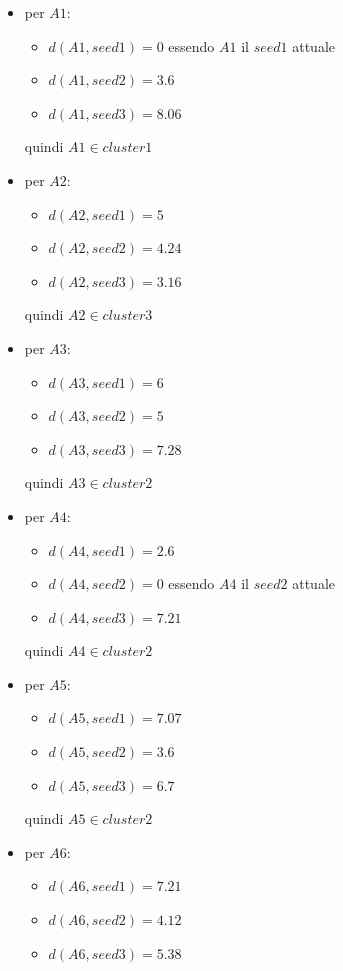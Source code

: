 \begin{esempio}
  \begin{itemize}
    \item per $A1$:
    \begin{itemize}
      \item $d(A1, seed1)=0$ essendo $A1$ il $seed1$ attuale
      \item $d(A1, seed2)=3.6$
      \item $d(A1, seed3)=8.06$
    \end{itemize}
    quindi $A1\in cluster1$
    \item per $A2$:
    \begin{itemize}
      \item $d(A2, seed1)=5$ 
      \item $d(A2, seed2)=4.24$
      \item $d(A2, seed3)=3.16$
    \end{itemize}
    quindi $A2\in cluster3$
    \item per $A3$:
    \begin{itemize}
      \item $d(A3, seed1)=6$ 
      \item $d(A3, seed2)=5$
      \item $d(A3, seed3)=7.28$
    \end{itemize}
    quindi $A3\in cluster2$
    \item per $A4$:
    \begin{itemize}
      \item $d(A4, seed1)=2.6$ 
      \item $d(A4, seed2)=0$ essendo $A4$ il $seed2$ attuale
      \item $d(A4, seed3)=7.21$
    \end{itemize}
    quindi $A4\in cluster2$
    \item per $A5$:
    \begin{itemize}
      \item $d(A5, seed1)=7.07$ 
      \item $d(A5, seed2)=3.6$
      \item $d(A5, seed3)=6.7$
    \end{itemize}
    quindi $A5\in cluster2$
    \item per $A6$:
    \begin{itemize}
      \item $d(A6, seed1)=7.21$ 
      \item $d(A6, seed2)=4.12$
      \item $d(A6, seed3)=5.38$
    \end{itemize}

\end{itemize}
\end{esempio}
